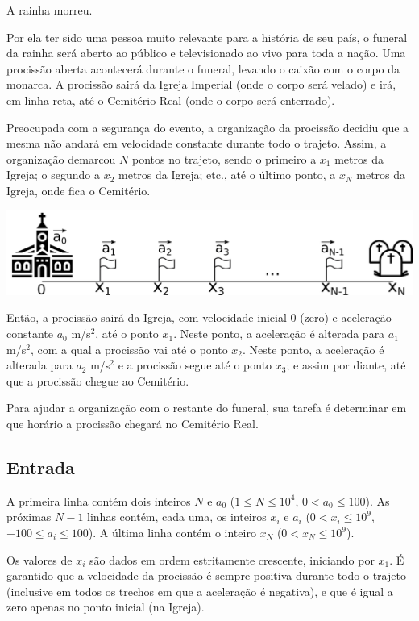 A rainha morreu.

Por ela ter sido uma pessoa muito relevante para a história de seu país, o funeral
da rainha será aberto ao público e televisionado ao vivo para toda a nação.
Uma procissão aberta acontecerá durante o funeral, levando o caixão com o corpo
da monarca. A procissão sairá da Igreja Imperial (onde o corpo será velado) e
irá, em linha reta, até o Cemitério Real (onde o corpo será enterrado).

Preocupada com a segurança do evento, a organização da procissão decidiu que a
mesma não andará em velocidade constante durante todo o trajeto. Assim,
a organização demarcou $N$ pontos no trajeto, sendo o primeiro a $x_1$ metros da
Igreja; o segundo a $x_2$ metros da Igreja; etc., até o último ponto, a $x_N$
metros da Igreja, onde fica o Cemitério.

\begin{center}
    \includegraphics[scale=0.8]{funeral/funeral.png}
\end{center}

Então, a
procissão sairá da Igreja, com velocidade inicial 0 (zero) e aceleração constante
$a_0$ m/s$^2$, até o ponto $x_1$. Neste ponto,
a aceleração é alterada para $a_1$ m/s$^2$, com a qual a procissão vai
até o ponto $x_2$. Neste ponto, a aceleração é alterada para $a_2$ m/s$^2$ e a
procissão segue até o ponto $x_3$; e assim por diante, até que a procissão chegue
ao Cemitério.

Para ajudar a organização com o restante do funeral, sua tarefa é determinar em
que horário a procissão chegará no Cemitério Real.


\subsection*{Entrada}

A primeira linha contém dois inteiros $N$ e $a_0$ ($1 \leq N \leq 10^4$, $0 <
        a_0 \leq 100$).
As próximas $N-1$ linhas contém, cada uma, os inteiros $x_i$ e $a_i$
($0 < x_i \leq 10^9$, $-100 \leq a_i \leq 100$).
A última linha contém o inteiro $x_N$ ($0 < x_N \leq 10^9$).

Os valores de $x_i$ são dados em ordem estritamente crescente, iniciando por $x_1$.
É garantido que a velocidade da procissão é sempre positiva durante todo o
trajeto (inclusive em todos os trechos em que a aceleração é negativa), e que é igual a zero apenas no ponto inicial (na Igreja).

